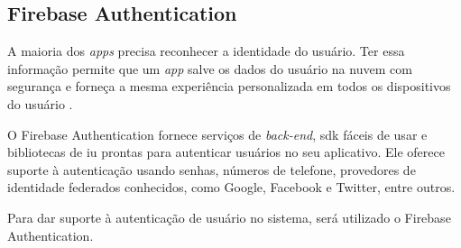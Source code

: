 \subsection{Firebase Authentication}
A maioria dos \textit{\glspl{app}} precisa reconhecer a identidade do usuário. Ter essa informação permite que um \textit{\gls{app}} salve os dados do usuário na nuvem com segurança e forneça a mesma experiência personalizada em todos os dispositivos do usuário \cite{authentication:2020}.


O Firebase Authentication fornece serviços de \textit{\gls{back-end}}, \ac{sdk} fáceis de usar e bibliotecas de \ac{iu} prontas para autenticar usuários no seu aplicativo. Ele oferece suporte à autenticação usando senhas, números de telefone, provedores de identidade federados conhecidos, como Google, Facebook e Twitter, entre outros.


Para dar suporte à autenticação de usuário no sistema, será utilizado o Firebase Authentication.
